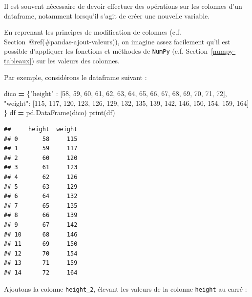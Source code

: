 \documentclass[12pt,]{book}
\newenvironment{Shaded}{\begin{snugshade}}{\end{snugshade}}
\newcommand{\DecValTok}[1]{\textcolor[rgb]{0.00,0.00,0.81}{#1}}
\newcommand{\StringTok}[1]{\textcolor[rgb]{0.31,0.60,0.02}{#1}}
\newcommand{\OperatorTok}[1]{\textcolor[rgb]{0.81,0.36,0.00}{\textbf{#1}}}
\newcommand{\BuiltInTok}[1]{#1}
\newcommand{\NormalTok}[1]{#1}
\numberwithin{equation}{section}
\numberwithin{countremarque}{section}
\begin{document}
Il est souvent nécessaire de devoir effectuer des opérations sur les
colonnes d'un dataframe, notamment lorsqu'il s'agit de créer une
nouvelle variable.

En reprenant les principes de modification de colonnes (c.f.
Section~@ref(\#pandas-ajout-valeurs)), on imagine assez facilement qu'il
est possible d'appliquer les fonctions et méthodes de \texttt{NumPy}
(c.f. Section~\ref{numpy-tableaux}) sur les valeurs des colonnes.

Par exemple, considérons le dataframe suivant :

\begin{Shaded}
\begin{Highlighting}[]
\NormalTok{dico }\OperatorTok{=}\NormalTok{ \{}\StringTok{"height"}\NormalTok{ : }
\NormalTok{               [}\DecValTok{58}\NormalTok{, }\DecValTok{59}\NormalTok{, }\DecValTok{60}\NormalTok{, }\DecValTok{61}\NormalTok{, }\DecValTok{62}\NormalTok{,}
                \DecValTok{63}\NormalTok{, }\DecValTok{64}\NormalTok{, }\DecValTok{65}\NormalTok{, }\DecValTok{66}\NormalTok{, }\DecValTok{67}\NormalTok{,}
                \DecValTok{68}\NormalTok{, }\DecValTok{69}\NormalTok{, }\DecValTok{70}\NormalTok{, }\DecValTok{71}\NormalTok{, }\DecValTok{72}\NormalTok{],}
        \StringTok{"weight"}\NormalTok{: }
\NormalTok{               [}\DecValTok{115}\NormalTok{, }\DecValTok{117}\NormalTok{, }\DecValTok{120}\NormalTok{, }\DecValTok{123}\NormalTok{, }\DecValTok{126}\NormalTok{,}
                \DecValTok{129}\NormalTok{, }\DecValTok{132}\NormalTok{, }\DecValTok{135}\NormalTok{, }\DecValTok{139}\NormalTok{, }\DecValTok{142}\NormalTok{,}
                \DecValTok{146}\NormalTok{, }\DecValTok{150}\NormalTok{, }\DecValTok{154}\NormalTok{, }\DecValTok{159}\NormalTok{, }\DecValTok{164}\NormalTok{]}
\NormalTok{       \} }
\NormalTok{df }\OperatorTok{=}\NormalTok{ pd.DataFrame(dico)}
\BuiltInTok{print}\NormalTok{(df)}
\end{Highlighting}
\end{Shaded}

\begin{lstlisting}
##     height  weight
## 0       58     115
## 1       59     117
## 2       60     120
## 3       61     123
## 4       62     126
## 5       63     129
## 6       64     132
## 7       65     135
## 8       66     139
## 9       67     142
## 10      68     146
## 11      69     150
## 12      70     154
## 13      71     159
## 14      72     164
\end{lstlisting}

Ajoutons la colonne \texttt{height\_2}, élevant les valeurs de la
colonne \texttt{height} au carré :
\end{document}
